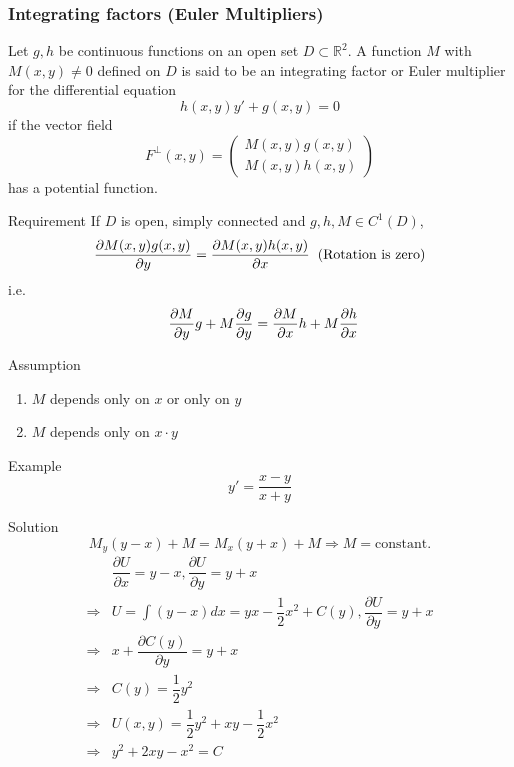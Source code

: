 \documentclass{beamer}
\begin{document}
\begin{frame}
\frametitle{Integrating factors (Euler Multipliers)}
Let $g,h$ be continuous functions on an open set $D\subset\mathbb{R}^2$. A function $M$ with $M(x,y)\neq0$ defined on $D$ is said to be an integrating factor or Euler multiplier for the differential equation
$$h(x,y)y'+g(x,y)=0$$
if the vector field
$$F^{\perp}(x,y)=\begin{pmatrix}
M(x,y)g(x,y)\\
M(x,y)h(x,y)
\end{pmatrix}$$
has a potential function.
\end{frame}

\begin{frame}
\begin{block}{Requirement}
If $D$ is open, simply connected and $g,h,M\in C^1(D)$,
$$\dfrac{\partial M(x,y)g(x,y)}{\partial y}=\dfrac{\partial M(x,y)h(x,y)}{\partial x}\hspace{2mm}\text{(Rotation is zero)}$$
i.e.
$$\hspace{2mm}\dfrac{\partial M}{\partial y}g+M\dfrac{\partial g}{\partial y}=\dfrac{\partial M}{\partial x}h+M\dfrac{\partial h}{\partial x}$$

\end{block}

\begin{block}{Assumption}
\begin{enumerate}
\item $M$ depends only on $x$ or only on $y$
\item $M$ depends only on $x\cdot y$
\end{enumerate}
\end{block}
\end{frame}

\begin{frame}
\begin{block}{Example}
$$y'=\dfrac{x-y}{x+y}$$
\end{block}
\end{frame}

\begin{frame}
\begin{block}{Solution}
$$M_y(y-x)+M=M_x(y+x)+M\Rightarrow M=\text{constant}.$$
\begin{align*}
&\dfrac{\partial U}{\partial x}=y-x,\dfrac{\partial U}{\partial y}=y+x\\
\Rightarrow &U=\int (y-x) dx=yx-\dfrac{1}{2}x^2+C(y),\dfrac{\partial U}{\partial y}=y+x\\
\Rightarrow&x+\dfrac{\partial C(y)}{\partial y}=y+x\\
\Rightarrow&C(y)=\dfrac{1}{2}y^2\\
\Rightarrow&U(x,y)=\dfrac{1}{2}y^2+xy-\dfrac{1}{2}x^2\\
\Rightarrow&y^2+2xy-x^2=C
\end{align*}
\end{block}
\end{frame}
\end{document}
